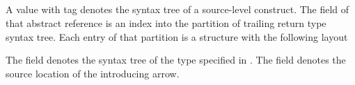 

\subsection{}
\label{sec:ifc:SyntaxSort:TrailingReturnType}

A  value with tag  denotes the syntax tree of a source-level  construct.
The  field of that abstract reference is an index into the partition of trailing return type syntax tree.
Each entry of that partition is a structure with the following layout
%
\begin{figure}[H]
	\centering
	\label{fig:ifc:SyntaxSort:TrailingReturnType}
\end{figure}
%
The  field denotes the syntax tree of the type specified in .
The  field denotes the source location of the introducing arrow.




\subsection{}
\label{sec:ifc:SyntaxSort:Declarator}


